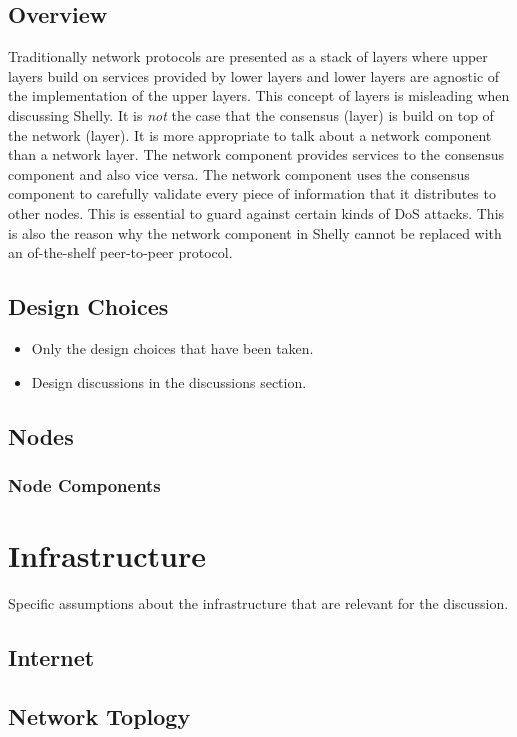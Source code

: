 \documentclass{report}
\theoremstyle{definition}{
  \newtheorem{lemma}{Lemma}[section] %
  \newtheorem{definition}[lemma]{Definition}
}
\theoremstyle{theorem}{
  \newtheorem{invariant}[lemma]{Invariant}
  \newtheorem{proofobligation}[lemma]{Proof Obligation}
}
\numberwithin{equation}{lemma}
\begin{document}
\section{Overview}

Traditionally network protocols are presented as a stack of layers where
upper layers build on services provided by lower layers and lower layers
are agnostic of the implementation of the upper layers.
This concept of layers is misleading when discussing Shelly.
It is {\em not} the case that the consensus (layer) is build on top of the network (layer).
It is more appropriate to talk about a network component than a network layer.
The network component provides services to the consensus component and also vice versa.
The network component uses the consensus component to carefully validate every piece of
information that it distributes to other nodes.
This is essential to guard against certain kinds of DoS attacks.
This is also the reason why the network component in Shelly cannot be replaced
with an of-the-shelf peer-to-peer protocol.

\section{Design Choices}
\begin{itemize}
\item Only the design choices that have been taken.
\item Design discussions in the discussions section.
\end{itemize}
\section{Nodes}
\subsection{Node Components}

\chapter{Infrastructure}
Specific assumptions about the infrastructure that are relevant for the discussion.

\section{Internet}
\section{Network Toplogy}
\end{document}

